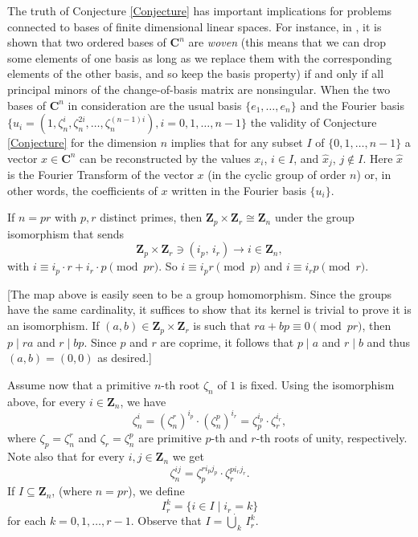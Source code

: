 \documentclass[a4paper,12pt,reqno]{amsart}
\def\Z{\mathbf{Z}}
\begin{document}
The truth of Conjecture \ref{Conjecture} has important implications for problems connected to bases of finite dimensional linear spaces. For instance, in \cite{Cabreli}, it is shown that two ordered bases of $\mathbf{C}^n$ are \textit{woven} (this means that we can drop some elements of one basis as long as we replace them with the corresponding elements of the other basis, and so keep the basis property) if and only if all principal minors of the change-of-basis matrix are nonsingular. When the two bases of $\mathbf{C}^n$ in consideration are the usual basis $\{e_1, \ldots, e_n\}$ and the Fourier basis $\{u_i = (1, \zeta_n^i, \zeta_n^{2i}, \ldots, \zeta_n^{(n-1)i}), i=0, 1, \ldots, n-1\}$ the validity of Conjecture \ref{Conjecture} for the dimension $n$ implies that for any subset $I$ of $\{0, 1, \ldots, n-1\}$ a vector $x \in \mathbf{C}^n$ can be reconstructed by the values $x_i$, $i \in I$, and $\widehat{x}_j$, $j \notin I$. Here $\widehat{x}$ is the Fourier Transform of the vector $x$ (in the cyclic group of order $n$) or, in other words, the coefficients of $x$ written in the Fourier basis $\{u_i\}$.



If $n=p r$  with $p,r$ distinct primes,     then $\Z_p \times \Z_r \cong \Z_n$ under the group  isomorphism that sends 
\begin{equation}\label{eq:isomo}
   \Z_p \times \Z_r \ni (i_p, \, i_r) \longrightarrow   i \in   \Z_n,
\end{equation}
 with   $i \equiv i_p \cdot r +i_r \cdot p  \pmod{ pr}$.  So $i \equiv i_p r \pmod p$ and $i \equiv i_r p \pmod r$. 
 
  [The map above  is easily seen to be a group homomorphism. Since the groups have the same cardinality, it suffices to show that its kernel is trivial to prove it is an isomorphism. If $(a, b) \in \Z_p \times \Z_r$ is such that $ra + bp \equiv 0 \pmod{pr}$, then $p \mid ra$ and $r \mid bp$. Since $p$ and $r$ are coprime, it follows that $p \mid a$ and $r \mid b$ and thus $(a,b) = (0,0)$ as desired.]

Assume now that a primitive $n$-th root $\zeta_n$ of $1$ is fixed. Using the isomorphism above, for every $i \in \Z_n$,  we have 
\begin{equation}\label{eq:zn^i}
\zeta_n^i = (\zeta_n^r)^{i_p} \cdot (\zeta_n^p)^{i_r}= \zeta_p^{i_p} \cdot \zeta_r^{i_r}, 
\end{equation}
where $\zeta_p = \zeta_n^r$  and $\zeta_r = \zeta_n^p$ are  primitive $p$-th and $r$-th roots of unity, respectively.
Note also that for every $i, j \in \Z_n$  we  get  
\[
\zeta_n^{ij}= \zeta_p^{ri_pj_p} \cdot \zeta_r^{pi_rj_r}.
\]
If $I \subseteq \Z_n$, (where $n = pr$), we define
\begin{equation}\label{eq:def}
I_r^k = \{ i \in I \mid i_r = k  \}
\end{equation}
for each $k = 0, 1, \ldots, r-1$. 
 Observe that $I = \dot\bigcup_{k}\,  I_r^k$. 
 
\end{document}
